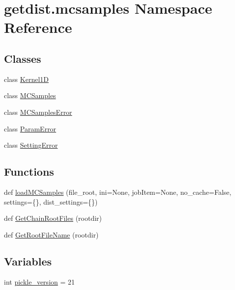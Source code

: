 \hypertarget{namespacegetdist_1_1mcsamples}{}\section{getdist.\+mcsamples Namespace Reference}
\label{namespacegetdist_1_1mcsamples}
\subsection*{Classes}
\begin{DoxyCompactItemize}
\item 
class \mbox{\hyperlink{classgetdist_1_1mcsamples_1_1Kernel1D}{Kernel1D}}
\item 
class \mbox{\hyperlink{classgetdist_1_1mcsamples_1_1MCSamples}{M\+C\+Samples}}
\item 
class \mbox{\hyperlink{classgetdist_1_1mcsamples_1_1MCSamplesError}{M\+C\+Samples\+Error}}
\item 
class \mbox{\hyperlink{classgetdist_1_1mcsamples_1_1ParamError}{Param\+Error}}
\item 
class \mbox{\hyperlink{classgetdist_1_1mcsamples_1_1SettingError}{Setting\+Error}}
\end{DoxyCompactItemize}
\subsection*{Functions}
\begin{DoxyCompactItemize}
\item 
def \mbox{\hyperlink{namespacegetdist_1_1mcsamples_a66a8bc2e3ca8236e828441cbf5db2cba}{load\+M\+C\+Samples}} (file\+\_\+root, ini=None, job\+Item=None, no\+\_\+cache=False, settings=\{\}, dist\+\_\+settings=\{\})
\item 
def \mbox{\hyperlink{namespacegetdist_1_1mcsamples_a19b6bbf020742d555e81b6a8bf1475e4}{Get\+Chain\+Root\+Files}} (rootdir)
\item 
def \mbox{\hyperlink{namespacegetdist_1_1mcsamples_a16f039cf1d6900bbbf3885c3f4182f81}{Get\+Root\+File\+Name}} (rootdir)
\end{DoxyCompactItemize}
\subsection*{Variables}
\begin{DoxyCompactItemize}
\item 
int \mbox{\hyperlink{namespacegetdist_1_1mcsamples_ac1aa58e9a915f4b3a863dae838ef8e5a}{pickle\+\_\+version}} = 21
\end{DoxyCompactItemize}


